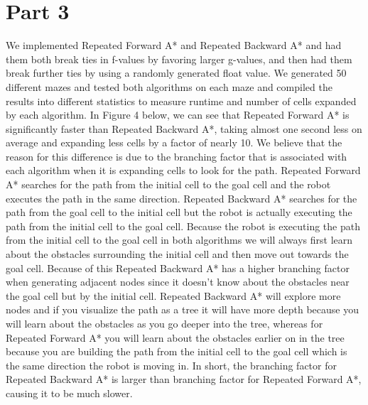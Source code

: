 \documentclass[12pt, letterpaper]{article}
\begin{document}
\section*{Part 3}
We implemented Repeated Forward A* and Repeated Backward A* and had them both break ties in f-values by favoring larger g-values, and then had them break further ties by using a randomly generated float value. We generated 50 different mazes and tested both algorithms on each maze and compiled the results into different statistics to measure runtime and number of cells expanded by each algorithm. In Figure 4 below, we can see that Repeated Forward A* is significantly faster than Repeated Backward A*, taking almost one second less on average and expanding less cells by a factor of nearly 10. We believe that the reason for this difference is due to the branching factor that is associated with each algorithm when it is expanding cells to look for the path. Repeated Forward A* searches for the path from the initial cell to the goal cell and the robot executes the path in the same direction. Repeated Backward A* searches for the path from the goal cell to the initial cell but the robot is actually executing the path from the initial cell to the goal cell. Because the robot is executing the path from the initial cell to the goal cell in both algorithms we will always first learn about the obstacles surrounding the initial cell and then move out towards the goal cell. Because of this Repeated Backward A* has a higher branching factor when generating adjacent nodes since it doesn’t know about the obstacles near the goal cell but by the initial cell. Repeated Backward A* will explore more nodes and if you visualize the path as a tree it will have more depth because you will learn about the obstacles as you go deeper into the tree, whereas for Repeated Forward A* you will learn about the obstacles earlier on in the tree because you are building the path from the initial cell to the goal cell which is the same direction the robot is moving in. In short, the branching factor for Repeated Backward A* is larger than branching factor for Repeated Forward A*, causing it to be much slower.   
\end{document}
